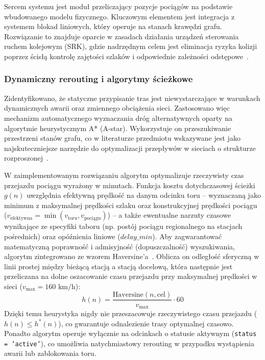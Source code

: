\documentclass[twoside]{projektInzynierskiMS1z}
\begin{document}
Sercem systemu jest moduł przeliczający pozycje pociągów na podstawie wbudowanego
modelu fizycznego. Kluczowym elementem jest integracja z systemem blokad liniowych,
który operuje na stanach krawędzi grafu. Rozwiązanie to znajduje oparcie w zasadach
działania urządzeń sterowania ruchem kolejowym (SRK), gdzie nadrzędnym celem jest
eliminacja ryzyka kolizji poprzez ścisłą kontrolę zajętości szlaków i odpowiednie
zależności odstępowe~\cite{srk}.

\subsubsection{Dynamiczny rerouting i algorytmy ścieżkowe}

Zidentyfikowano, że statyczne przypisanie tras jest niewystarczające w warunkach
dynamicznych awarii oraz zmiennego obciążenia sieci. Zastosowano więc mechanizm
automatycznego wyznaczania dróg alternatywnych oparty na algorytmie heurystycznym A*
(A-star). Wykorzystuje on przeszukiwanie przestrzeni stanów grafu, co w literaturze
przedmiotu wskazywane jest jako najskuteczniejsze narzędzie do optymalizacji
przepływów w sieciach o strukturze rozproszonej~\cite{astar1968}.

W zaimplementowanym rozwiązaniu algorytm optymalizuje rzeczywisty czas przejazdu
pociągu wyrażony w minutach. Funkcja kosztu dotychczasowej ścieżki $g(n)$ uwzględnia
efektywną prędkość na danym odcinku toru -- wyznaczaną jako minimum z maksymalnej
prędkości szlaku oraz konstrukcyjnej prędkości pociągu
($v_{\text{efektywna}} = \min(v_{\text{toru}}, v_{\text{pociągu}})$) -- a także
ewentualne narzuty czasowe wynikające ze specyfiki taboru (np. postój pociągu
regionalnego na stacjach pośrednich) oraz opóźnienia liniowe ($delay\_min$). Aby
zagwarantować matematyczną poprawność i admisyjność (dopuszczalność) wyszukiwania,
algorytm zintegrowano ze wzorem Haversine'a~\cite{haversine}. Oblicza on odległość
sferyczną w linii prostej między bieżącą stacją a stacją docelową, która następnie
jest przeliczana na dolne oszacowanie czasu przejazdu przy maksymalnej prędkości
w sieci ($v_{\max} = 160\text{ km/h}$):
\begin{equation}
h(n) = \frac{\text{Haversine}(n, \text{cel})}{v_{\max}} \cdot 60
\end{equation}
Dzięki temu heurystyka nigdy nie przeszacowuje rzeczywistego czasu przejazdu
($h(n) \le h^*(n)$), co gwarantuje odnalezienie trasy optymalnej czasowo. Ponadto
algorytm operuje wyłącznie na odcinkach o statusie aktywnym (\texttt{status = 'active'}),
co umożliwia natychmiastowy rerouting w przypadku wystąpienia awarii lub zablokowania
toru.
\end{document}
